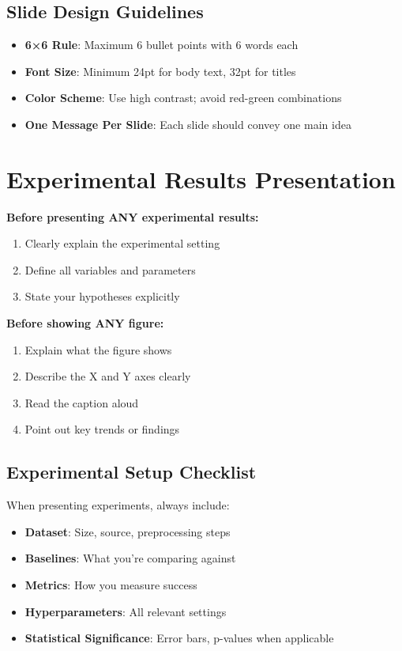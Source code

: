 \documentclass[11pt,a4paper]{article}
\begin{document}
\subsection{Slide Design Guidelines}
\begin{itemize}
    \item \textbf{6×6 Rule}: Maximum 6 bullet points with 6 words each
    \item \textbf{Font Size}: Minimum 24pt for body text, 32pt for titles
    \item \textbf{Color Scheme}: Use high contrast; avoid red-green combinations
    \item \textbf{One Message Per Slide}: Each slide should convey one main idea
\end{itemize}

\section{Experimental Results Presentation}

\begin{tcolorbox}[colback=yellow!10,colframe=red!50,title=Critical Requirements]
\textbf{Before presenting ANY experimental results:}
\begin{enumerate}
    \item Clearly explain the experimental setting
    \item Define all variables and parameters
    \item State your hypotheses explicitly
\end{enumerate}

\textbf{Before showing ANY figure:}
\begin{enumerate}
    \item Explain what the figure shows
    \item Describe the X and Y axes clearly
    \item Read the caption aloud
    \item Point out key trends or findings
\end{enumerate}
\end{tcolorbox}

\subsection{Experimental Setup Checklist}
When presenting experiments, always include:
\begin{itemize}
    \item \textbf{Dataset}: Size, source, preprocessing steps
    \item \textbf{Baselines}: What you're comparing against
    \item \textbf{Metrics}: How you measure success
    \item \textbf{Hyperparameters}: All relevant settings
    \item \textbf{Statistical Significance}: Error bars, p-values when applicable
\end{itemize}
\end{document}
